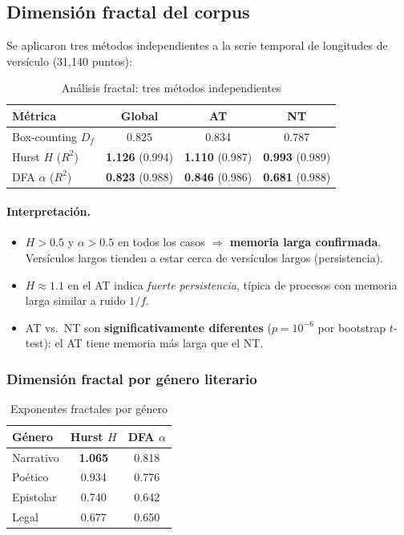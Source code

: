 \documentclass[12pt,a4paper]{article}
\newcommand{\ot}{\textcolor{otcolor}{\textbf{AT}}}
\newcommand{\nt}{\textcolor{ntcolor}{\textbf{NT}}}
\newcommand{\val}[1]{\textcolor{hlcolor}{\textbf{#1}}}
\begin{document}
\subsection{Dimensi\'on fractal del corpus}

Se aplicaron tres m\'etodos independientes a la serie temporal de longitudes de
vers\'iculo (31,140 puntos):

\begin{table}[H]
\centering
\caption{An\'alisis fractal: tres m\'etodos independientes}
\label{tab:fractal}
\begin{tabular}{lccc}
\toprule
\textbf{M\'etrica} & \textbf{Global} & \textbf{\ot{}} & \textbf{\nt{}} \\
\midrule
Box-counting $D_f$             & 0.825 & 0.834 & 0.787 \\
Hurst $H$ ($R^2$)              & \val{1.126} (0.994) & \val{1.110} (0.987) & \val{0.993} (0.989) \\
DFA $\alpha$ ($R^2$)           & \val{0.823} (0.988) & \val{0.846} (0.986) & \val{0.681} (0.988) \\
\bottomrule
\end{tabular}
\end{table}

\paragraph{Interpretaci\'on.}
\begin{itemize}[leftmargin=2em]
\item $H > 0.5$ y $\alpha > 0.5$ en todos los casos $\Rightarrow$ \textbf{memoria larga confirmada}.
      Vers\'iculos largos tienden a estar cerca de vers\'iculos largos (persistencia).
\item $H \approx 1.1$ en el AT indica \emph{fuerte persistencia}, t\'ipica de procesos
      con memoria larga similar a ruido $1/f$.
\item AT vs.\ NT son \textbf{significativamente diferentes} ($p = 10^{-6}$ por bootstrap $t$-test):
      el AT tiene memoria m\'as larga que el NT.
\end{itemize}

\subsubsection{Dimensi\'on fractal por g\'enero literario}

\begin{table}[H]
\centering
\caption{Exponentes fractales por g\'enero}
\label{tab:fractalgenre}
\begin{tabular}{lcc}
\toprule
\textbf{G\'enero} & \textbf{Hurst $H$} & \textbf{DFA $\alpha$} \\
\midrule
Narrativo   & \val{1.065} & 0.818 \\
Po\'etico   & 0.934 & 0.776 \\
Epistolar   & 0.740 & 0.642 \\
Legal       & 0.677 & 0.650 \\
\bottomrule
\end{tabular}
\end{table}
\end{document}
